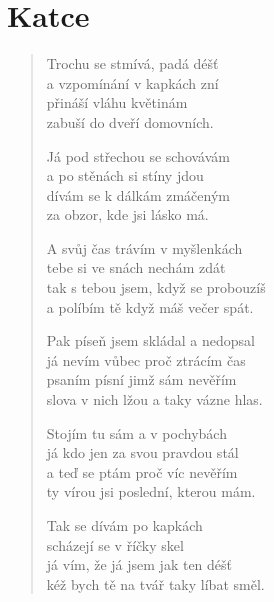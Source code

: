 \section{Katce}

\begin{verse}
Trochu se stmívá, padá déšť \\
a vzpomínání v kapkách zní \\
přináší vláhu květinám \\
zabuší do dveří domovních.

Já pod střechou se schovávám \\
a po stěnách si stíny jdou \\
dívám se k dálkám zmáčeným \\
za obzor, kde jsi lásko má.

A svůj čas trávím v myšlenkách \\
tebe si ve snách nechám zdát \\
tak s tebou jsem, když se probouzíš \\
a políbím tě když máš večer spát.

Pak píseň jsem skládal a nedopsal \\
já nevím vůbec proč ztrácím čas \\
psaním písní jimž sám nevěřím \\
slova v nich lžou a taky vázne hlas.

Stojím tu sám a v pochybách \\
já kdo jen za svou pravdou stál \\
a teď se ptám proč víc nevěřím \\
ty vírou jsi poslední, kterou mám.

Tak se dívám po kapkách \\
scházejí se v říčky skel \\
já vím, že já jsem jak ten déšť \\
kéž bych tě na tvář taky líbat směl.



\end{verse}
